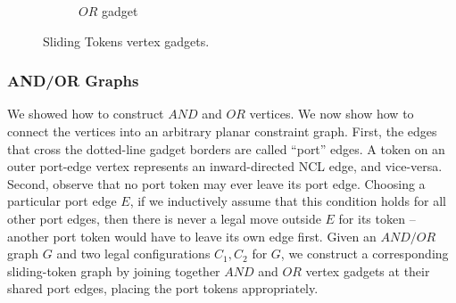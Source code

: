 \begin{figure} [H]
\begin{subfigure}[b]{0.4\textwidth}
\begin{scaletikzpicturetowidth}{\textwidth}
    \end{scaletikzpicturetowidth}
    \caption{$OR$ gadget}
    \label{fig:or_gadget_sliding_token}
  \end{subfigure}
  \caption{Sliding Tokens vertex gadgets.}
  \label{fig:and_or_gadgets_sliding_token}
\end{figure}

\subsubsection{AND/OR Graphs}
We showed how to construct $AND$ and $OR$ vertices. We now show how to connect the vertices into an arbitrary planar constraint graph.
First, the edges that cross the dotted-line gadget borders are called “port” edges. A token on an outer port-edge vertex represents an
inward-directed NCL edge, and vice-versa. Second, observe that no port token may ever leave its port edge. Choosing a particular port
edge $E$, if we inductively assume that this condition holds for all other port edges, then there is never a legal move outside $E$ for
its token – another port token would have to leave its own edge first.
Given an $AND/OR$ graph $G$ and two legal configurations $C_1, C_2$ for $G$, we construct a corresponding sliding-token graph by joining together
$AND$ and $OR$ vertex gadgets at their shared port edges, placing the port tokens appropriately.



